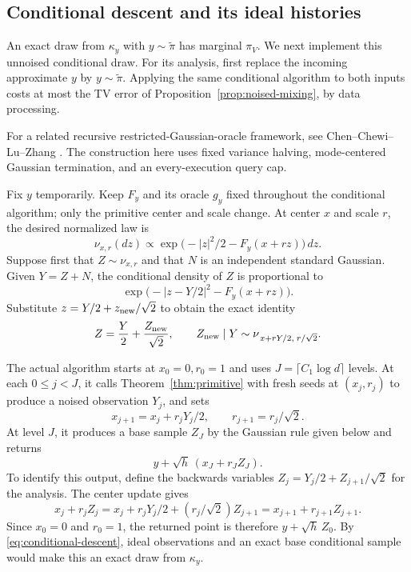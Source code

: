 \subsection{Conditional descent and its ideal histories}

An exact draw from $\kappa_y$ with $y\sim\widetilde\pi$ has
marginal $\pi_V$. We next implement this unnoised conditional draw.
For its analysis, first replace the incoming approximate $y$ by
$y\sim\widetilde\pi$. Applying the same conditional algorithm to
both inputs costs at most the TV error of
Proposition~\ref{prop:noised-mixing}, by data processing.

For a related recursive restricted-Gaussian-oracle framework, see
Chen--Chewi--Lu--Zhang \cite[Algorithm~3.3 and Section~6.3]{chen2026picard}.
The construction here uses fixed variance halving, mode-centered Gaussian
termination, and an every-execution query cap.

Fix $y$ temporarily. Keep $F_y$ and its oracle $g_y$ fixed throughout
the conditional algorithm; only the primitive center and scale
change. At center $x$ and scale $r$, the desired normalized law is
\[
 \nu_{x,r}(dz)\propto
             \exp\bigl(-|z|^2/2-F_y(x+rz)\bigr)\,dz.
\]
Suppose first that $Z\sim\nu_{x,r}$ and that $N$ is an independent
standard Gaussian. Given $Y=Z+N$, the conditional density of $Z$
is proportional to
\[
             \exp\bigl(-|z-Y/2|^2-F_y(x+rz)\bigr).
\]
Substitute $z=Y/2+z_{\rm new}/\sqrt2$ to obtain the exact identity
\begin{equation}\label{eq:conditional-descent}
 Z=\frac Y2+\frac{Z_{\rm new}}{\sqrt2},\qquad
 Z_{\rm new}\mid Y\sim\nu_{\,x+rY/2,\;r/\sqrt2}.
\end{equation}

The actual algorithm starts at $x_0=0,r_0=1$ and uses
$J=\lceil C_1\log d\rceil$ levels. At each $0\le j<J$, it calls
Theorem~\ref{thm:primitive} with fresh seeds at $(x_j,r_j)$ to
produce a noised observation $Y_j$, and sets
\[
 x_{j+1}=x_j+r_jY_j/2,\qquad r_{j+1}=r_j/\sqrt2.
\]
At level $J$, it produces a base sample $Z_J$ by the Gaussian
rule given below and returns
\[
                         y+\sqrt h\,(x_J+r_JZ_J).
\]
To identify this output, define the backwards variables
$Z_j=Y_j/2+Z_{j+1}/\sqrt2$ for the analysis. The center update gives
\[
 x_j+r_jZ_j
 =x_j+r_jY_j/2+(r_j/\sqrt2)Z_{j+1}
 =x_{j+1}+r_{j+1}Z_{j+1}.
\]
Since $x_0=0$ and $r_0=1$, the returned point is therefore
$y+\sqrt h\,Z_0$. By \eqref{eq:conditional-descent}, ideal
observations and an exact base conditional sample would make this
an exact draw from $\kappa_y$.

